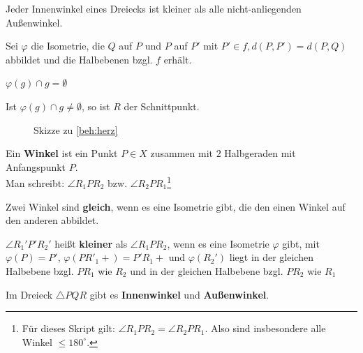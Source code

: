 \begin{bemerkung}
    Jeder Innenwinkel eines Dreiecks ist kleiner als alle nicht-anliegenden
    Außenwinkel.
\end{bemerkung}

\begin{beweis}
    Sei $\varphi$ die Isometrie, die $Q$ auf $P$ und $P$ auf $P'$
    mit $P' \in f, d(P,P') = d(P, Q)$ abbildet und die Halbebenen
    bzgl. $f$ erhält.
\end{beweis}

\begin{behauptung}[Herz]\label{beh:herz}
    $\varphi(g) \cap g = \emptyset$
\end{behauptung}

\begin{beweis}
    Ist $\varphi(g) \cap g \neq \emptyset$, so ist $R$ der Schnittpunkt.
\end{beweis}

\begin{figure}[htp]
    \centering
    
    \caption{Skizze zu \cref{beh:herz}}
    \label{fig:bild-6}
\end{figure}

\begin{definition}\label{def:14.8}%
    \begin{defenum}
        \item \label{def:14.8a} Ein \textbf{Winkel} ist ein Punkt $P \in X$ 
              zusammen mit $2$ Halbgeraden mit Anfangspunkt $P$.\\
              Man schreibt: $\angle R_1 P R_2$ bzw. $\angle R_2 P R_1$\footnote{Für dieses Skript gilt: $\angle R_1 P R_2 = \angle R_2 P R_1$. Also sind insbesondere alle Winkel $ \leq 180^\circ$.}
        \item Zwei Winkel sind \textbf{gleich}, wenn es eine Isometrie gibt, 
              die den einen Winkel auf den anderen abbildet.
        \item \label{def:14.8c} $\angle R_1' P' R_2'$ heißt \textbf{kleiner} als
              $\angle R_1 P R_2$, wenn es eine Isometrie $\varphi$
              gibt, mit $\varphi(P) = P'$, $\varphi(PR'_1+) = P' R_1 +$
              und $\varphi(R_2')$ liegt in der gleichen Halbebene 
              bzgl. $PR_1$ wie $R_2$ und in der gleichen Halbebene
              bzgl. $PR_2$ wie $R_1$
        \item \label{def:14.8d} Im Dreieck $\triangle PQR$ gibt es \textbf{Innenwinkel} und
              \textbf{Außenwinkel}.
    \end{defenum}
\end{definition}

